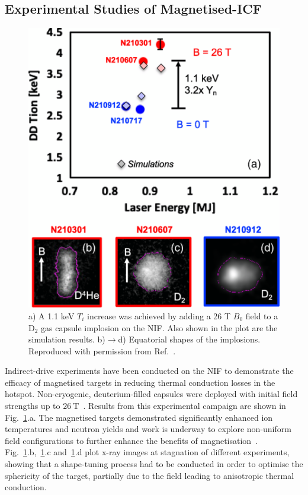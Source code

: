 \subsection{Experimental Studies of Magnetised-ICF}%
\label{sec:Res2_magicf_prevwork}

\begin{figure}[t!]
    \includegraphics[width=0.5\linewidth]{Results2/Images/magnif_yield_inc.png}
    \centering
    \caption{a) A 1.1 keV $T_i$ increase was achieved by adding a 26 T $B_0$ field to a D${}_{2}$ gas capsule implosion on the \ac{NIF}.
    Also shown in the plot are the simulation results.
    b)$\rightarrow$d) Equatorial shapes of the implosions.
    Reproduced with permission from Ref.~\cite{moody_increased_2022}.}%
    \label{fig:Res2_moody_magnif}
\end{figure}

Indirect-drive experiments have been conducted on the \ac{NIF} to demonstrate the efficacy of magnetised targets in reducing thermal conduction losses in the hotspot.
Non-cryogenic, deuterium-filled capsules were deployed with initial field strengths up to $26\ \text{T}$~\cite{moody_increased_2022}.
Results from this experimental campaign are shown in Fig.~\ref{fig:Res2_moody_magnif}.a.
The magnetised targets demonstrated significantly enhanced ion temperatures and neutron yields and work is underway to explore non-uniform field configurations to further enhance the benefits of magnetisation~\cite{walsh_application_2023}.
Fig.~\ref{fig:Res2_moody_magnif}.b,~\ref{fig:Res2_moody_magnif}.c and~\ref{fig:Res2_moody_magnif}.d plot x-ray images at stagnation of different experiments, showing that a shape-tuning process had to be conducted in order to optimise the sphericity of the target, partially due to the field leading to anisotropic thermal conduction.

